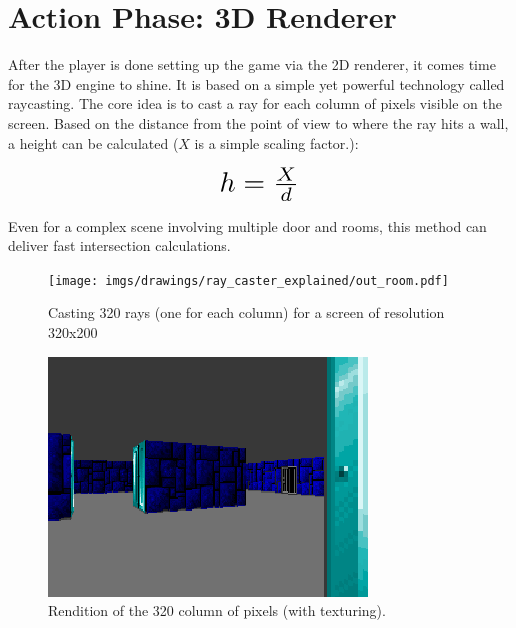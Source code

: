 \section{Action Phase: 3D Renderer}
After the player is done setting up the game via the 2D renderer, it comes time for the 3D engine to shine. It is based on a simple yet powerful technology called raycasting. The core idea is to cast a ray for each column of pixels visible on the screen. Based on the distance  from the point of view to where the ray hits a wall, a height  can be calculated ($X$ is a simple scaling factor.):\\
\par
\begin{figure}[H]
  \centering
  \begin{equation*}
      \scalebox{2.0}{$h = \frac{X}{d}$} 
  \end{equation*}
\end{figure}
\par
Even for a complex scene involving multiple door and rooms, this method can deliver fast intersection calculations.
\par
\begin{figure}[H]
\centering
 \texttt{[image: imgs/drawings/ray\_caster\_explained/out\_room.pdf]}
 \caption{Casting 320 rays (one for each column) for a screen of resolution 320x200} \label{fig:Raycasting2}
\end{figure}

\begin{figure}[H]
  \centering
 \includegraphics[width=\textwidth]{imgs/drawings/ray_caster_explained/out_door.png}
 \caption{Rendition of the 320 column of pixels (with texturing).} 
\end{figure} 


